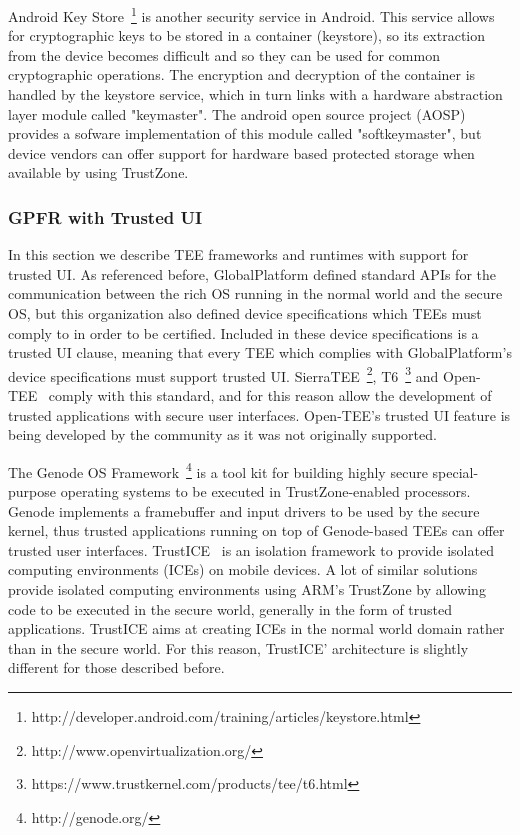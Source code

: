 Android Key Store~\footnote{http://developer.android.com/training/articles/keystore.html} is another security service in Android. This service allows for cryptographic keys to be stored in a container (keystore), so its extraction from the device becomes difficult and so they can be used for common cryptographic operations. The encryption and decryption of the container is handled by the keystore service, which in turn links with a hardware abstraction layer module called "keymaster". The android open source project (AOSP) provides a sofware implementation of this module called "softkeymaster", but device vendors can offer support for hardware based protected storage when available by using TrustZone.

\subsubsection{GPFR with Trusted UI}

In this section we describe TEE frameworks and runtimes with support for trusted UI. As referenced before, GlobalPlatform defined standard APIs for the communication between the rich OS running in the normal world and the secure OS, but this organization also defined device specifications which TEEs must comply to in order to be certified. Included in these device specifications is a trusted UI clause, meaning that every TEE which complies with GlobalPlatform's device specifications must support trusted UI. SierraTEE~\footnote{http://www.openvirtualization.org/}, T6~\footnote{https://www.trustkernel.com/products/tee/t6.html} and Open-TEE~\cite{mcgillion2015open} comply with this standard, and for this reason allow the development of trusted applications with secure user interfaces.
Open-TEE's trusted UI feature is being developed by the community as it was not originally supported.

The Genode OS Framework~\footnote{http://genode.org/} is a tool kit for building highly secure special-purpose operating systems to be executed in TrustZone-enabled processors. Genode implements a framebuffer and input drivers to be used by the secure kernel, thus trusted applications running on top of Genode-based TEEs can offer trusted user interfaces. TrustICE~\cite{sun2015trustice} is an isolation framework to provide isolated computing environments (ICEs) on mobile devices. A lot of similar solutions provide isolated computing environments using ARM's TrustZone by allowing code to be executed in the secure world, generally in the form of trusted applications. TrustICE aims at creating ICEs in the normal world domain rather than in the secure world. For this reason, TrustICE' architecture is slightly different for those described before.
